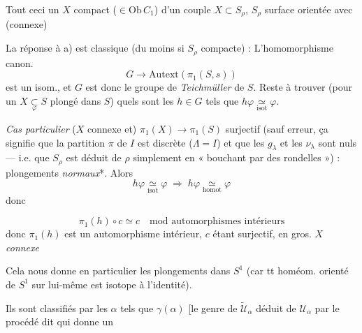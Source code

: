 \documentclass[11pt,a4paper]{article}
\begin{document}
Tout ceci  \ill{} un $X$ compact ($\in \mathrm{Ob}\, C_1$)
 d'un couple $X \subset S_{\rho}$, $S_{\rho}$ surface
orientée avec \struck{\ill{}} (connexe)

La réponse à a) est classique (du moins si $S_{\rho}$ compacte) :
\struck{\ill{}} L'homomorphisme canon.
\[
G \longrightarrow \mathrm{Autext}(\pi_1(S, s))
\]
est un isom., et $G$ est donc le groupe de \emph{Teichmüller} de \struck{\ill{}}
$S$. Reste à trouver (pour un $X \underset{\varphi}{\subset} S$ plongé dans
$S$) quels sont les $h \in G$ tels que $h\varphi \underset{\mathrm{isot}}{\simeq}
\varphi$.

\emph{Cas particulier} ($X$ connexe et) $\pi_1(X) \to \pi_1(S)$ surjectif
(sauf erreur, ça signifie que la partition $\pi$ de $I$ est discrète
($\Lambda = I$) et que les $g_{\lambda}$ et les $\nu_{\lambda}$ sont nuls ---
i.e. que $S_{\rho}$ est déduit de $\rho$ simplement en « bouchant
 \ill{} par des rondelles ») : plongements
\emph{normaux}*. Alors
\[
h\varphi \underset{\mathrm{isot}}{\simeq} \varphi \;\Longrightarrow\;
h\varphi \underset{\mathrm{homot}}{\simeq} \varphi
\]
donc



\[
\pi_1(h) \circ c \simeq c \quad \text{mod automorphismes intérieurs}
\]
donc $\pi_1(h)$ est un automorphisme intérieur, $c$ étant surjectif, en gros.
 $X$ \emph{connexe}


Cela nous donne en particulier les plongements dans $S^1$ (car tt
 homéom. orienté de $S^1$ sur lui-même est isotope à
l'identité).

Ils sont classifiés par les $\alpha$ tels que $\gamma(\alpha)$ [le genre de
$\tilde{\mathcal{U}}_{\alpha}$ déduit de $\mathcal{U}_{\alpha}$ par le procédé
dit qui donne \struck{\ill{}} un
\end{document}
